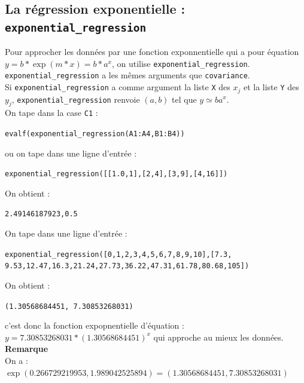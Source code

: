 \documentclass[a4paper,11pt]{book}
\begin{document}
\subsection{La r\'egression exponentielle : {\tt exponential\_regression}}\label{sec:expreg}
Pour approcher les donn\'ees par une fonction exponnentielle qui a pour
\'equation $y=b*\exp(m*x)=b*a^x$, on utilise  {\tt exponential\_regression}.\\
 {\tt exponential\_regression} a  les m\^emes arguments que {\tt covariance}.\\
Si {\tt exponential\_regression} a comme argument la liste {\tt X} des $x_j$ 
et la liste {\tt Y}
 des $y_j$, {\tt exponential\_regression} renvoie $(a, b)$ tel que 
$y \simeq ba^x$.\\
On tape dans la case {\tt C1} :
\begin{center}{\tt evalf(exponential\_regression(A1:A4,B1:B4))}\end{center}
ou on tape dans une ligne d'entr\'ee :
\begin{center}{\tt exponential\_regression([[1.0,1],[2,4],[3,9],[4,16]])}\end{center}
On obtient :
\begin{center}{\tt 2.49146187923,0.5}\end{center}
On tape dans une ligne d'entr\'ee :
\begin{center}{\tt exponential\_regression([0,1,2,3,4,5,6,7,8,9,10],[7.3, 9.53,12.47,16.3,21.24,27.73,36.22,47.31,61.78,80.68,105])}\end{center}
On obtient :
\begin{center}{\tt (1.30568684451, 7.30853268031)}\end{center}
c'est donc la fonction expopnentielle d'\'equation :\\
$y=7.30853268031*(1.30568684451)^x$ qui approche au mieux les donn\'ees.\\
{\bf Remarque} \\
On a :\\
$\exp(0.266729219953,1.989042525894)=(1.30568684451, 7.30853268031)$
\end{document}
